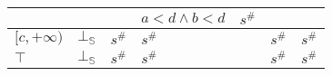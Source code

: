 \documentclass[aspectratio=169]{beamer}
\begin{document}
\begin{frame}
\begin{table}[]
{\begin{tabular}{|l|l|ll|ll|ll|l|}
                                        &                         &                          &                                    & $a< d \land b < d$    & $s^\#$                       &                          &                                               &                                                     \\ \hline
        $[c, +\infty)$                  & $\bot_\mathbb{S}$                  & \multicolumn{2}{l|}{$s^\#$}                                   & \multicolumn{2}{l|}{$s^\#$}                          & \multicolumn{2}{l|}{$s^\#$}                                              & $s^\#$                                              \\ \hline
        $\top$                          & $\bot_\mathbb{S}$                  & \multicolumn{2}{l|}{$s^\#$}                                   & \multicolumn{2}{l|}{$s^\#$}                          & \multicolumn{2}{l|}{$s^\#$}                                              & $s^\#$                                              \\ \hline
        \end{tabular}}
        \end{table}
    \end{frame}
    
\end{document}
